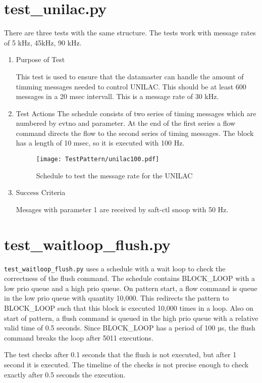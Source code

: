 \documentclass[12pt,a4paper]{report}
\begin{document}
\section{test\_unilac.py}
There are three tests with the same structure. The tests work with message rates of
5 kHz, 45kHz, 90 kHz.
\begin{enumerate}
  \item Purpose of Test

  This test is used to ensure that the datamaster can handle the amount of timming messages
  needed to control UNILAC. This should be at least 600 messages in a 20 msec intervall. This
  is a message rate of 30 kHz.
  \item Test Actions
  The schedule consists of two series of timing messages which are numbered by evtno and parameter.
  At the end of the first series a flow command directs the flow to the second series of timing messages.
  The block has a length of 10 msec, so it is executed with 100 Hz.
    \begin{figure}
        \centering
        \texttt{[image: TestPattern/unilac100.pdf]}
        \caption{Schedule to test the message rate for the UNILAC}
        \label{fig:unilac100}
    \end{figure}
  \item Success Criteria

  Mesages with parameter 1 are received by saft-ctl snoop with 50 Hz.
\end{enumerate}

\section{test\_waitloop\_flush.py}
\texttt{test\_waitloop\_flush.py} uses a schedule with a wait loop to check
the correctness of the flush command. The schedule contains BLOCK\_LOOP with a low
prio queue and a high prio queue. On pattern start, a flow command is queue in
the low prio queue with quantity 10,000. This redirects the pattern to
BLOCK\_LOOP such that this block is executed 10,000 times in a loop. Also
on start of pattern, a flush command is queued in the high prio queue with a
relative valid time of 0.5 seconds. Since BLOCK\_LOOP has a period of 100 µs,
the flush command breaks the loop after 5011 executions.

The test checks after 0.1 seconds that the flush is not executed, but after 1 second
it is executed. The timeline of the checks is not precise enough to check
exactly after 0.5 seconds the execution.
\end{document}
